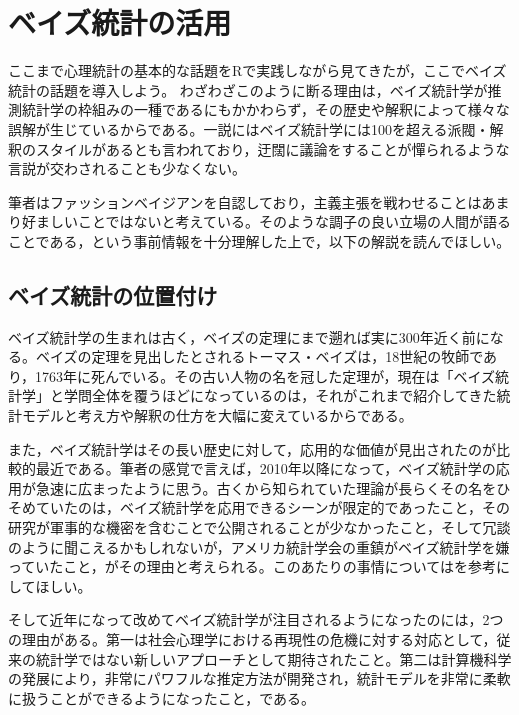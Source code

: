 \documentclass[
  a4paper,
]{ltjsbook}
\begin{document}
\chapter{ベイズ統計の活用}\label{ux30d9ux30a4ux30baux7d71ux8a08ux306eux6d3bux7528}

ここまで心理統計の基本的な話題をRで実践しながら見てきたが，ここでベイズ統計の話題を導入しよう。
わざわざこのように断る理由は，ベイズ統計学が推測統計学の枠組みの一種であるにもかかわらず，その歴史や解釈によって様々な誤解が生じているからである。一説にはベイズ統計学には100を超える派閥・解釈のスタイルがあるとも言われており，迂闊に議論をすることが憚られるような言説が交わされることも少なくない。

筆者はファッションベイジアンを自認しており，主義主張を戦わせることはあまり好ましいことではないと考えている。そのような調子の良い立場の人間が語ることである，という事前情報を十分理解した上で，以下の解説を読んでほしい。

\section{ベイズ統計の位置付け}\label{ux30d9ux30a4ux30baux7d71ux8a08ux306eux4f4dux7f6eux4ed8ux3051}

ベイズ統計学の生まれは古く，ベイズの定理にまで遡れば実に300年近く前になる。ベイズの定理を見出したとされるトーマス・ベイズは，18世紀の牧師であり，1763年に死んでいる。その古い人物の名を冠した定理が，現在は「ベイズ統計学」と学問全体を覆うほどになっているのは，それがこれまで紹介してきた統計モデルと考え方や解釈の仕方を大幅に変えているからである。

また，ベイズ統計学はその長い歴史に対して，応用的な価値が見出されたのが比較的最近である。筆者の感覚で言えば，2010年以降になって，ベイズ統計学の応用が急速に広まったように思う。古くから知られていた理論が長らくその名をひそめていたのは，ベイズ統計学を応用できるシーンが限定的であったこと，その研究が軍事的な機密を含むことで公開されることが少なかったこと，そして冗談のように聞こえるかもしれないが，アメリカ統計学会の重鎮がベイズ統計学を嫌っていたこと，がその理由と考えられる。このあたりの事情については\autocite{mcgrayne2011theory}を参考にしてほしい。

そして近年になって改めてベイズ統計学が注目されるようになったのには，2つの理由がある。第一は社会心理学における再現性の危機に対する対応として，従来の統計学ではない新しいアプローチとして期待されたこと。第二は計算機科学の発展により，非常にパワフルな推定方法が開発され，統計モデルを非常に柔軟に扱うことができるようになったこと，である。
\end{document}
